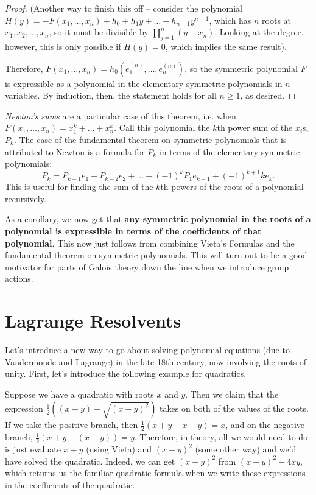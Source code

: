\documentclass[12pt]{scrartcl}
\begin{document}
\begin{proof}
	(Another way to finish this off -- consider the polynomial $H(y) = -F(x_1, \dots, x_n) + h_0 + h_1 y + \dots + h_{n-1} y^{n-1}$, which has $n$ roots at $x_1, x_2, \dots, x_n$, so it must be divisible by $\prod_{j=1}^n (y - x_n)$. Looking at the degree, however, this is only possible if $H(y) = 0$, which implies the same result).

	Therefore, $F(x_1, \dots, x_n) = h_0(e_1^{(n)}, \dots, e_n^{(n)})$, so the symmetric polynomial $F$ is expressible as a polynomial in the elementary symmetric polynomials in $n$ variables. By induction, then, the statement holds for all $n \geq 1$, as desired.
\end{proof}

\begin{remark}
	\textit{Newton's sums} are a particular case of this theorem, i.e. when $F(x_1, \dots, x_n) = x_1^k + \dots + x_n^k$. Call this polynomial the $k$th power sum of the $x_i$s, $P_k$. The case of the fundamental theorem on symmetric polynomials that is attributed to Newton is a formula for $P_k$ in terms of the elementary symmetric polynomials:
	\[
		P_k = P_{k-1} e_1 - P_{k-2} e_2 + \dots + (-1)^{k} P_1 e_{k-1} + (-1)^{k+1} k e_k
		.\]
	This is useful for finding the sum of the $k$th powers of the roots of a polynomial recursively.
\end{remark}

As a corollary, we now get that \textbf{any symmetric polynomial in the roots of a polynomial is expressible in terms of the coefficients of that polynomial}. This now just follows from combining Vieta's Formulas and the fundamental theorem on symmetric polynomials. This will turn out to be a good motivator for parts of Galois theory down the line when we introduce group actions.

\section{Lagrange Resolvents}
Let's introduce a new way to go about solving polynomial equations (due to Vandermonde and Lagrange) in the late 18th century, now involving the roots of unity. First, let's introduce the following example for quadratics.

Suppose we have a quadratic with roots $x$ and $y$. Then we claim that the expression $\frac 12 ( (x + y) \pm  \sqrt{ (x-y)^2 })$ takes on both of the values of the roots. If we take the positive branch, then $\frac 12( x + y + x - y ) = x$, and on the negative branch, $\frac 12( x + y - (x - y)) = y$. Therefore, in theory, all we would need to do is just evaluate $x + y$ (using Vieta) and $(x - y)^2$ (some other way) and we'd have solved the quadratic. Indeed, we can get $(x-y)^2$ from $(x+y)^2 - 4xy$, which returns us the familiar quadratic formula when we write these expressions in the coefficients of the quadratic.
\end{document}
